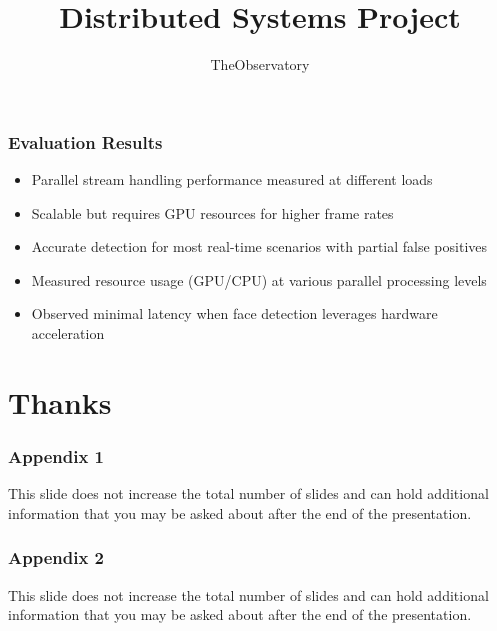 \documentclass[11pt,t,usepdftitle=false,aspectratio=169]{beamer}
\begin{document}
\begin{frame}
\frametitle{Evaluation Results}
\begin{itemize}
	\item Parallel stream handling performance measured at different loads
	\item Scalable but requires GPU resources for higher frame rates
	\item Accurate detection for most real-time scenarios with partial false positives
	\item Measured resource usage (GPU/CPU) at various parallel processing levels
	\item Observed minimal latency when face detection leverages hardware acceleration
\end{itemize}
\end{frame}


\title[TheObservatory]{Distributed Systems Project}
\subtitle{TheObservatory}
\section{Thanks}


\appendix

\begin{frame} %
\frametitle{Appendix 1}
    This slide does not increase the total number of slides and can hold additional information
    that you may be asked about after the end of the presentation.
\end{frame}

\begin{frame}
\frametitle{Appendix 2}
    This slide does not increase the total number of slides and can hold additional information
    that you may be asked about after the end of the presentation.
\end{frame}
\end{document}
